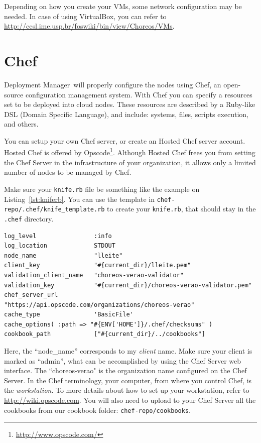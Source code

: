 \documentclass[a4paper, 10pt]{article}
\newcommand{\dm}{Deployment Manager}
\begin{document}
Depending on how you create your VMs, some network configuration may be needed. In case of using VirtualBox, you can refer to \url{http://ccsl.ime.usp.br/foswiki/bin/view/Choreos/VMs}.

\section{Chef}
\label{sec:chef}

\dm\ will properly configure the nodes using Chef, an open-source configuration management system. With Chef you can specify a resources set to be deployed into cloud nodes. These resources are described by a Ruby-like DSL (Domain Specific Language), and include: systems, files, scripts execution, and others.

You can setup your own Chef server, or create an Hosted Chef server account. Hosted Chef is offered by Opscode\footnote{\url{http://www.opscode.com/}}. Although Hosted Chef frees you from setting the Chef Server in the infrastructure of your organization, it allows only a limited number of nodes to be managed by Chef.

Make sure your \texttt{knife.rb} file be something like the example on Listing~\ref{lst:kniferb}. You can use the template in \texttt{chef-repo/.chef/knife\_template.rb} to create your \texttt{knife.rb}, that should stay in the \texttt{.chef} directory.

{\footnotesize
\begin{lstlisting}[caption=knife.rb example,label=lst:kniferb] 
log_level                :info 
log_location             STDOUT 
node_name                "lleite" 
client_key               "#{current_dir}/lleite.pem" 
validation_client_name   "choreos-verao-validator" 
validation_key           "#{current_dir}/choreos-verao-validator.pem" 
chef_server_url          "https://api.opscode.com/organizations/choreos-verao" 
cache_type               'BasicFile' 
cache_options( :path => "#{ENV['HOME']}/.chef/checksums" ) 
cookbook_path            ["#{current_dir}/../cookbooks"] 
\end{lstlisting}
}

Here, the ``node\_name'' corresponds to my \emph{client} name. Make sure your client is marked as ``admin'', what can be accomplished by using the Chef Server web interface.  The  ``choreos-verao" is the organization name configured on the Chef Server. In the Chef terminology, your computer, from where you control Chef, is the \emph{workstation}. To more details about how to set up your workstation, refer to \url{http://wiki.opscode.com}. You will also need to upload to your Chef Server all the cookbooks from our cookbook folder: \texttt{chef-repo/cookbooks}.
\end{document}
